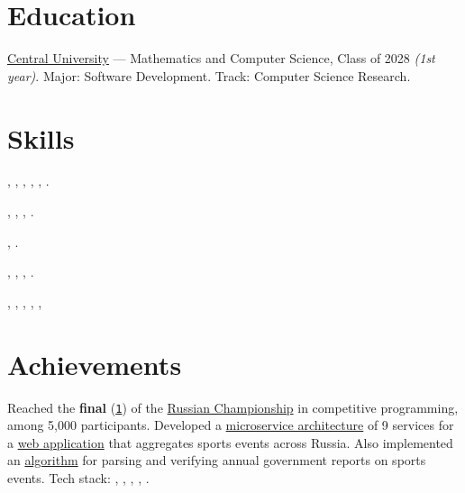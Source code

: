 \documentclass[margin,line]{resume}
\begin{document}
\begin{resume}
  \section{\mysidestyle Education}
  \href{https://centraluniversity.ru/}{Central University} —
  Mathematics and Computer Science, Class of 2028 \textit{(1st year)}.
  Major: Software Development. Track: Computer Science Research.

  \section{\mysidestyle Skills}

  \vspace{0.4mm}
  \begin{description}[leftmargin=0pt, itemindent=*, itemsep=0.2pt]
    \item[Go:] , ,
      , ,
      , .
    \item[Databases:] , ,
      , .
    \item[Message brokers:] , .
    \item[Other technologies:] , ,
      , .
    \item[Dev tools:] , ,
      , , ,
  \end{description}

  \section{\mysidestyle Achievements}
  Reached the \textbf{final}
  (\href{https://alchemmist.github.io/CV/attachments/russian-chemp-final.pdf}{\texttt{1}})
  of the \href{https://events.fsp-russia.com/championship}{Russian
  Championship} in competitive programming, among 5,000 participants.
  Developed a
  \href{https://alchemmist.github.io/CV/attachments/architect.pdf}{microservice
  architecture} of 9 services for a
  \href{https://github.com/alchemmist/sportprog}{web application}
  that aggregates sports events across Russia. Also implemented an
  \href{https://github.com/alchemmist/sport-afisha/blob/main/event_parsing_service/parse_pdf.py}{algorithm}
  for parsing and verifying annual government reports on sports events.
  Tech stack: , ,
  ,
  ,
  .


\end{resume}
\end{document}
